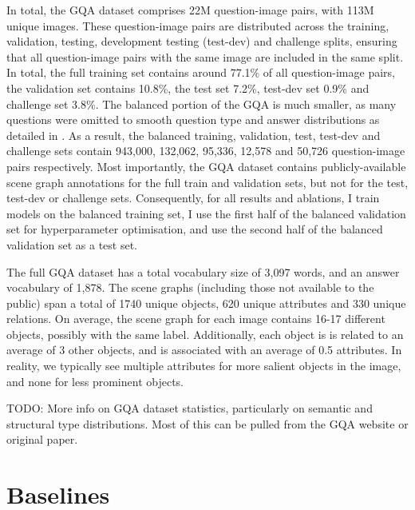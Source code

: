 In total, the GQA dataset comprises 22M question-image pairs, with 113M unique images. These question-image pairs are distributed across the training, validation, testing, development testing (test-dev) and challenge splits, ensuring that all question-image pairs with the same image are included in the same split. In total, the full training set contains around 77.1\% of all question-image pairs, the validation set contains 10.8\%, the test set 7.2\%, test-dev set 0.9\% and challenge set 3.8\%. The balanced portion of the GQA is much smaller, as many questions were omitted to smooth question type and answer distributions as detailed in \subsectionautorefname{ \ref{subsec:lanauge_priors_in_vqa_datasets}}. As a result, the balanced training, validation, test, test-dev and challenge sets contain 943,000, 132,062, 95,336, 12,578 and 50,726 question-image pairs respectively. Most importantly, the GQA dataset contains publicly-available scene graph annotations for the full train and validation sets, but not for the test, test-dev or challenge sets. Consequently, for all results and ablations, I train models on the balanced training set, I use the first half of the balanced validation set for hyperparameter optimisation, and use the second half of the balanced validation set as a test set.

The full GQA dataset has a total vocabulary size of 3,097 words, and an answer vocabulary of 1,878. The scene graphs (including those not available to the public) span a total of 1740 unique objects, 620 unique attributes and 330 unique relations. On average, the scene graph for each image contains 16-17 different objects, possibly with the same label. Additionally, each object is is related to an average of 3 other objects, and is associated with an average of 0.5 attributes. In reality, we typically see multiple attributes for more salient objects in the image, and none for less prominent objects.


{\color{red} TODO: More info on GQA dataset statistics, particularly on semantic and structural type distributions. Most of this can be pulled from the GQA website or original paper.}





\section{Baselines}

